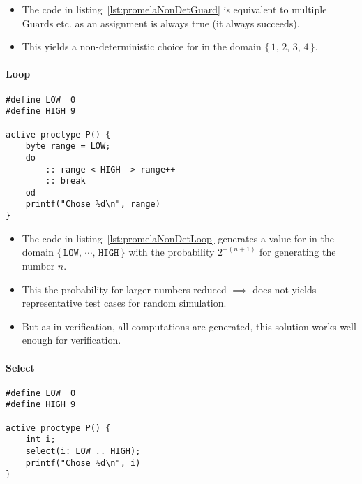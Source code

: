 			\begin{itemize}
				\item The code in listing~\ref{lst:promelaNonDetGuard} is equivalent to multiple Guards  etc. as an assignment is always true (it always succeeds).
				\item This yields a non-deterministic choice for  in the domain \( \{\, 1,\, 2,\, 3,\, 4 \,\} \).
			\end{itemize}

		\paragraph{Loop}
			\begin{lstlisting}[caption = { PROMELA Non-Deterministic Value Generation by Loop }, label = lst:promelaNonDetLoop, language = PROMELA]
#define LOW  0
#define HIGH 9

active proctype P() {
	byte range = LOW;
	do
		:: range < HIGH -> range++
		:: break
	od
	printf("Chose %d\n", range)
}
				\end{lstlisting}

			\begin{itemize}
				\item The code in listing~\ref{lst:promelaNonDetLoop} generates a value for  in the domain \( \{\, \texttt{LOW},\, \cdots,\, \texttt{HIGH} \,\} \) with the probability \( 2^{-(n + 1)} \) for generating the number \(n\).
				\item This the probability for larger numbers reduced \( \implies \) does not yields representative test cases for random simulation.
				\item But as in verification, all computations are generated, this solution works well enough for verification.
			\end{itemize}

		\paragraph{Select}
			\begin{lstlisting}[caption = { PROMELA Non-Deterministic Value Generation by Select }, label = lst:promelaNonDetSelect, language = PROMELA]
#define LOW  0
#define HIGH 9

active proctype P() {
	int i;
	select(i: LOW .. HIGH);
	printf("Chose %d\n", i)
}
				\end{lstlisting}

